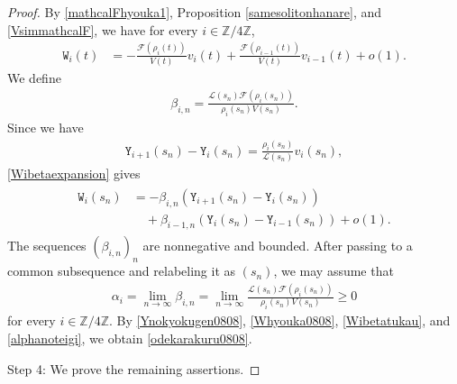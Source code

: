 \documentclass[10pt,a4paper]{amsart}
\numberwithin{equation}{section}
\begin{document}
\begin{proof}
By \eqref{mathcalFhyouka1}, Proposition \ref{samesolitonhanare}, and \eqref{VsimmathcalF}, we have for every
$i\in\mathbb{Z}/4\mathbb{Z}$,
\begin{align}\label{Wibetaexpansion}
\mathtt{W}_i(t)&=-\frac{\mathcal{F}(\rho_i(t))}{V(t)}v_i(t)+\frac{\mathcal{F}(\rho_{i-1}(t))}{V(t)}v_{i-1}(t)+o(1).
\end{align}
We define
\begin{align*}
\beta_{i,n}=\frac{\mathcal{L}(s_n)\mathcal{F}(\rho_i(s_n))}{\rho_i(s_n)V(s_n)}.
\end{align*}
Since we have 
\begin{align*}
\mathtt{Y}_{i+1}(s_n)-\mathtt{Y}_i(s_n)=\frac{\rho_i(s_n)}{\mathcal{L}(s_n)}v_i(s_n),
\end{align*}
\eqref{Wibetaexpansion} gives
\begin{align}\label{Wibetatukau}
\begin{aligned}
\mathtt{W}_i(s_n)&=-\beta_{i,n}\left(\mathtt{Y}_{i+1}(s_n)-\mathtt{Y}_i(s_n)\right)
\\
&\quad+\beta_{i-1,n}\left(\mathtt{Y}_i(s_n)-\mathtt{Y}_{i-1}(s_n)\right)+o(1).
\end{aligned}
\end{align}
The sequences $(\beta_{i,n})_n$ are nonnegative and bounded. After passing to a common subsequence and relabeling it as $(s_n)$, we may assume that
\begin{align}\label{alphanoteigi}
\alpha_i=\lim_{n\to\infty}\beta_{i,n}=\lim_{n\to\infty}\frac{\mathcal{L}(s_n)\mathcal{F}(\rho_i(s_n))}{\rho_i(s_n)V(s_n)}\geq 0
\end{align}
for every $i\in\mathbb{Z}/4\mathbb{Z}$. By \eqref{Ynokyokugen0808}, \eqref{Whyouka0808}, \eqref{Wibetatukau}, and \eqref{alphanoteigi}, we obtain \eqref{odekarakuru0808}.



Step 4: We prove the remaining assertions.



\end{proof}
\end{document}
